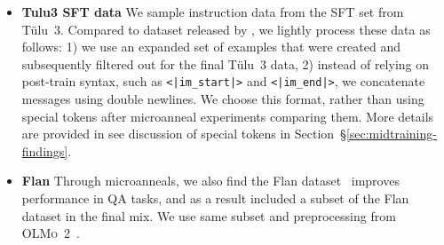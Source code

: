 \documentclass[table]{ai2style/ai2}
\newcommand{\oldOlmo}{OLMo\xspace}
\newcommand{\tulu}{T\"ulu~3\xspace}
\newcommand{\olmotoo}{\textsc{\oldOlmo~2}\xspace}
\begin{document}
\begin{itemize}
\item{\bf Tulu3 SFT data} We sample instruction data from the  SFT set from \tulu. Compared to dataset released by  \citet{lambert2024tulu3}, we lightly process these data as follows:
1) we use an expanded  set of examples that were created and subsequently filtered out for the final \tulu data, 2) instead of relying on post-train syntax, such as \texttt{<|im\_start|>} and \texttt{<|im\_end|>}, we concatenate messages using double newlines. We choose this format, rather than using special tokens after microanneal experiments comparing them. More details are provided in see discussion of special tokens in Section~\S\ref{sec:midtraining-findings}.

\item{\bf Flan} Through microanneals, we also find the Flan dataset~\citep{wei2021flan,longpre2023flan} improves performance in QA tasks, and as a result included a subset of the Flan dataset in the final mix. We use same subset and preprocessing from  \olmotoo~\citep{olmo20242olmo2furious}. 
\end{itemize}
\end{document}
